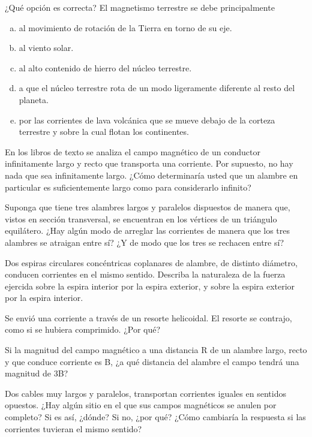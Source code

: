 %
\begin{Exercise}
    ¿Qué opción es correcta? El magnetismo terrestre se debe principalmente
    \begin{enumerate}[a)]
        \item al movimiento de rotación de la Tierra en torno de su eje.
        \item al viento solar.
        \item al alto contenido de hierro del núcleo terrestre.
        \item a que el núcleo terrestre rota de un modo ligeramente diferente al resto del planeta.
        \item por las corrientes de lava volcánica que se mueve debajo de la corteza terrestre y sobre la cual flotan los continentes.
    \end{enumerate}
\end{Exercise}
%
\begin{Exercise}
    En los libros de texto se analiza el campo magnético de un conductor infinitamente largo y recto que transporta una corriente. Por supuesto, no hay nada que sea infinitamente largo. ¿Cómo determinaría usted que un alambre en particular es suficientemente largo como para considerarlo infinito?
\end{Exercise}
%
\begin{Exercise}
    Suponga que tiene tres alambres largos y paralelos dispuestos de manera que, vistos en sección
    transversal, se encuentran en los vértices de un triángulo equilátero. ¿Hay algún modo de arreglar las corrientes de manera que los tres alambres se atraigan entre sí? ¿Y de modo que los tres se rechacen entre sí?
\end{Exercise}
%
\begin{Exercise}
    Dos espiras circulares concéntricas coplanares de alambre, de distinto diámetro, conducen corrientes en el mismo sentido. Describa la naturaleza de la fuerza ejercida sobre la espira interior por la espira exterior, y sobre la espira exterior por la espira interior.
\end{Exercise}
%
\begin{Exercise}
    Se envió una corriente a través de un resorte helicoidal. El resorte se contrajo, como si se hubiera comprimido. ¿Por qué?
\end{Exercise}
%
\begin{Exercise}
    Si la magnitud del campo magnético a una distancia R de un alambre largo, recto y que conduce
    corriente es B, ¿a qué distancia del alambre el campo tendrá una magnitud de 3B?
\end{Exercise}
%
\begin{Exercise}
    Dos cables muy largos y paralelos, transportan corrientes iguales en sentidos opuestos. ¿Hay
    algún sitio en el que sus campos magnéticos se anulen por completo? Si es así, ¿dónde? Si no, ¿por qué? ¿Cómo cambiaría la respuesta si las corrientes tuvieran el mismo sentido?
\end{Exercise}
%
